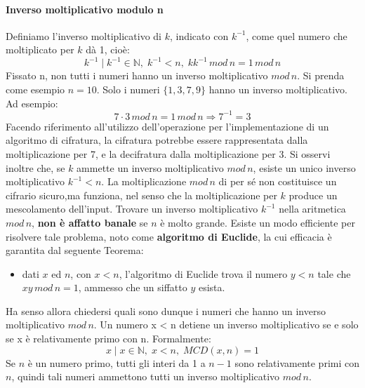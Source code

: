 \paragraph{Inverso moltiplicativo modulo n}
Definiamo l'inverso moltiplicativo di $k$, indicato con $k^{-1}$, come quel numero che moltiplicato per $k$ dà 1, cioè:
\begin{equation}
k^{-1} \mid k^{-1} \in \mathbb{N}, \; k^{-1} < n,\; kk^{-1} \, mod \, n = 1 \, mod \, n
\end{equation}
Fissato n, non tutti i numeri hanno un inverso moltiplicativo $mod \, n$. Si prenda come esempio $n = 10$. Solo i numeri $\{1,3,7,9\}$ hanno un inverso moltiplicativo. Ad esempio:
\begin{equation}
7 \cdot 3 \, mod \,n = 1 \, mod \, n \Rightarrow 7^{-1} = 3
\end{equation}
Facendo riferimento all'utilizzo dell'operazione per l'implementazione di un algoritmo di cifratura, la cifratura potrebbe essere rappresentata dalla moltiplicazione per 7, e la decifratura dalla moltiplicazione per 3.
\newline \newline
Si osservi inoltre che, se $k$ ammette un inverso moltiplicativo $mod \, n $, esiste un unico inverso moltiplicativo $k^{-1} < n$. La moltiplicazione $mod \, n$ di per sé non costituisce un cifrario sicuro,ma funziona, nel senso che la moltiplicazione per $k$ produce un mescolamento dell'input.
\newline \newline
Trovare un inverso moltiplicativo $k^{-1}$ nella aritmetica $mod \, n$, \textbf{non è affatto banale} se $n$ è molto grande. Esiste un modo efficiente per risolvere tale problema, noto come \textbf{algoritmo di Euclide}, la cui efficacia è garantita dal seguente Teorema: 
\begin{itemize} \label{eq:euclide}
\item dati $x$ ed $n$, con $x<n$, l'algoritmo di Euclide trova il numero $y<n$ tale che $xy \, mod \, n = 1$, ammesso che un siffatto $y$ esista.
\end{itemize} 

Ha senso allora chiedersi quali sono dunque i numeri che hanno un inverso moltiplicativo $mod \, n$. Un numero x < n detiene un inverso moltiplicativo se e solo se x è relativamente primo con n. Formalmente:
\begin{equation}
x \mid x \in \mathbb{N},\; x < n,\; MCD(x,n) = 1
\end{equation}
Se $n$ è un numero primo, tutti gli interi da 1 a $n-1$ sono relativamente primi con $n$, quindi tali numeri ammettono tutti un inverso moltiplicativo $mod \, n$.

